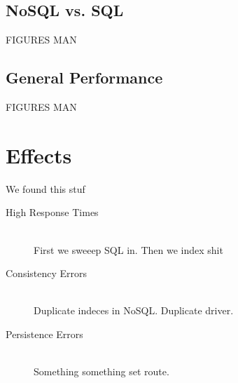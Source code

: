 \subsection{NoSQL vs. SQL}
FIGURES MAN

\subsection{General Performance}
FIGURES MAN

\section{Effects}
We found this stuf
\begin{description}
    \item[High Response Times]\hfill \\
        First we sweeep SQL in. Then we index shit
    \item[Consistency Errors]\hfill \\
        Duplicate indeces in NoSQL. Duplicate driver.
    \item[Persistence Errors]\hfill \\
        Something something set route.
\end{description}

